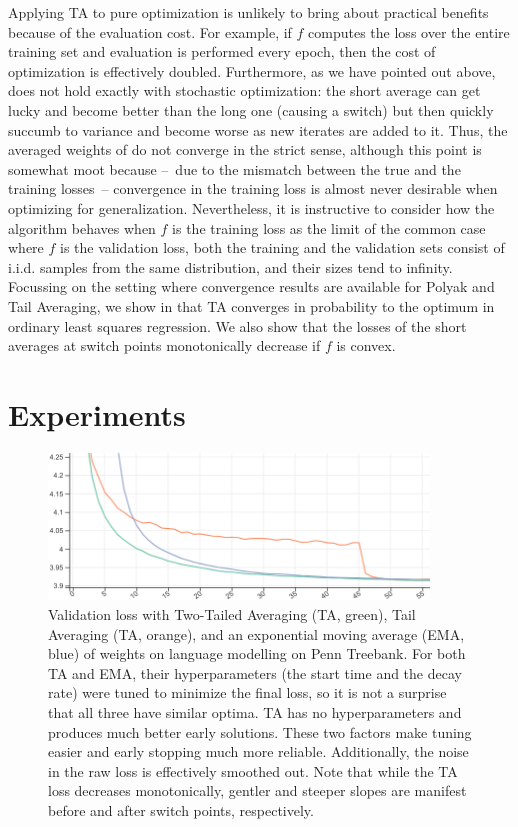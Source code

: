 \documentclass[twocolumn]{article}
\newcommand{\tta}{\liningnums{2}TA}
\begin{document}
Applying \tta{} to pure optimization is unlikely to bring about practical benefits because of the evaluation cost.
For example, if $f$ computes the loss over the entire training set and evaluation is performed every epoch, then the cost of optimization is effectively doubled.
Furthermore, as we have pointed out above,  does not hold exactly with stochastic optimization: the short average can get lucky and become better than the long one (causing a switch) but then quickly succumb to variance and become worse as new iterates are added to it.
Thus, the averaged weights of  do not converge in the strict sense, although this point is somewhat moot because --~due to the mismatch between the true and the training losses~-- convergence in the training loss is almost never desirable when optimizing for generalization.
Nevertheless, it is instructive to consider how the algorithm behaves when $f$ is the training loss as the limit of the common case where $f$ is the validation loss, both the training and the validation sets consist of i.i.d. samples from the same distribution, and their sizes tend to infinity.
Focussing on the setting where convergence results are available for Polyak and Tail Averaging, we show in  that \tta{} converges in probability to the optimum in ordinary least squares regression.
We also show that the losses of the short averages at switch points monotonically decrease if $f$ is convex.


\section{Experiments}
\label{sec:tta-experiments}

\begin{figure}[t]
  \centering
  \includegraphics[width=0.9\textwidth]{figure/oswa-vs.png}
  \caption[Validation losses with Two-Tailed Averaging and baselines.]{Validation loss with Two-Tailed Averaging (\tta{}, green), Tail Averaging (TA, orange), and an exponential moving average (EMA, blue) of weights on language modelling on Penn Treebank.
For both TA and EMA, their hyperparameters (the start time and the decay rate) were tuned to minimize the final loss, so it is not a surprise that all three have similar optima.
\tta{} has no hyperparameters and produces much better early solutions.
These two factors make tuning easier and early stopping much more reliable.
Additionally, the noise in the raw loss is effectively smoothed out.
Note that while the \tta{} loss decreases monotonically, gentler and steeper slopes are manifest before and after switch points, respectively.}
  \label{fig:swa-vs-oooswa}
\end{figure}
\end{document}
